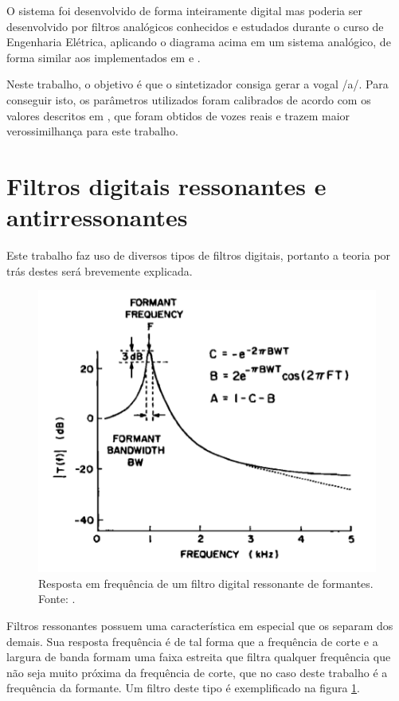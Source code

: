 \documentclass[
  12pt,       
  openright,      
  twoside,      
  a4paper,      
  english,      
  french,       
  spanish,      
  brazil,     
  ]{abntex2}
\begin{document}
O sistema foi desenvolvido de forma inteiramente digital mas poderia ser desenvolvido por filtros analógicos conhecidos e estudados durante o curso de Engenharia Elétrica, aplicando o diagrama acima  em um sistema analógico, de forma similar aos implementados em   e .

Neste trabalho, o objetivo é que o sintetizador consiga gerar a vogal /a/. Para conseguir isto, os parâmetros utilizados foram calibrados de acordo com os valores descritos em , que foram obtidos de vozes reais e trazem maior verossimilhança para este trabalho.

\section{Filtros digitais ressonantes e antirressonantes}
\label{subsec:teoriafiltros}
Este trabalho faz uso de diversos tipos de filtros digitais, portanto a teoria por trás destes será brevemente explicada.

\begin{figure}
\centering
\includegraphics[scale=0.8]{imagens/grafico_filtro_digital.PNG}
\caption{Resposta em frequência de um filtro digital ressonante de formantes. Fonte: .}
\label{fig:respFreqFiltroDigital}
\centering
\end{figure}

Filtros ressonantes possuem uma característica em especial que os separam dos demais. Sua resposta frequência é de tal forma que a frequência de corte e a largura de banda formam uma faixa estreita que filtra qualquer frequência que não seja muito próxima da frequência de corte, que no caso deste trabalho é a frequência da formante. Um filtro deste tipo é exemplificado na figura \ref{fig:respFreqFiltroDigital}.
\end{document}
